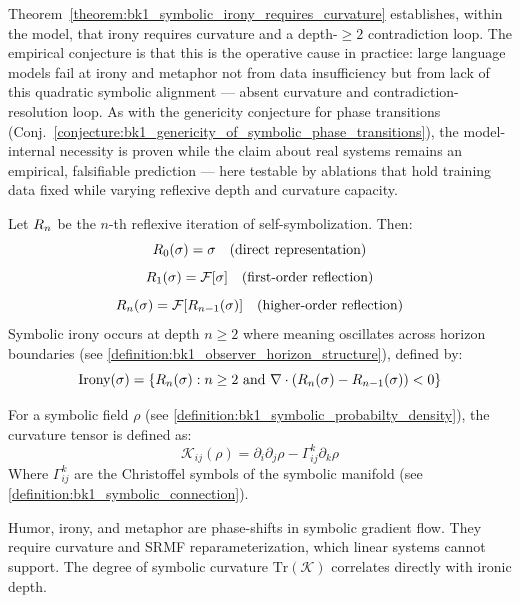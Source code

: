 \begin{conjecture}
\label{conjecture:bk1_symbolic_irony_encoding_llms}
Theorem~\ref{theorem:bk1_symbolic_irony_requires_curvature} establishes, within the model, that irony requires curvature and a depth-$\ge2$ contradiction loop. The empirical conjecture is that this is the operative cause in practice: large language models fail at irony and metaphor not from data insufficiency but from lack of this quadratic symbolic alignment --- absent curvature and contradiction-resolution loop. As with the genericity conjecture for phase transitions (Conj.~\ref{conjecture:bk1_genericity_of_symbolic_phase_transitions}), the model-internal necessity is proven while the claim about real systems remains an empirical, falsifiable prediction --- here testable by ablations that hold training data fixed while varying reflexive depth and curvature capacity.
\end{conjecture}

\begin{definition}
\label{definition:bk1_reflexive_encoding_depth}
Let $R_n$ be the $n$-th reflexive iteration of self-symbolization. Then:
\[
R_0(\sigma) = \sigma \quad \text{(direct representation)}
\]
\[
R_1(\sigma) = \mathcal{F}[\sigma] \quad \text{(first-order reflection)}
\]
\[
R_n(\sigma) = \mathcal{F}[R_{n-1}(\sigma)] \quad \text{(higher-order reflection)}
\]
Symbolic irony occurs at depth $n \geq 2$ where meaning oscillates across horizon boundaries (see \ref{definition:bk1_observer_horizon_structure}), defined by:
\[
\text{Irony}(\sigma) = \{R_n(\sigma) : n \geq 2 \text{ and } \nabla \cdot (R_n(\sigma) - R_{n-1}(\sigma)) < 0\}
\]
\end{definition}

\begin{definition}
\label{definition:bk1_symbolic_field_curvature_tensor}
For a symbolic field $\rho$ (see \ref{definition:bk1_symbolic_probabilty_density}), the curvature tensor is defined as:
\[
\mathcal{K}_{ij}(\rho) = \partial_i \partial_j \rho - \Gamma^k_{ij} \partial_k \rho
\]
Where $\Gamma^k_{ij}$ are the Christoffel symbols of the symbolic manifold (see \ref{definition:bk1_symbolic_connection}).
\end{definition}

\begin{remark}
Humor, irony, and metaphor are phase-shifts in symbolic gradient flow. They require curvature and SRMF reparameterization, which linear systems cannot support. The degree of symbolic curvature $\text{Tr}(\mathcal{K})$ correlates directly with ironic depth.
\end{remark}
